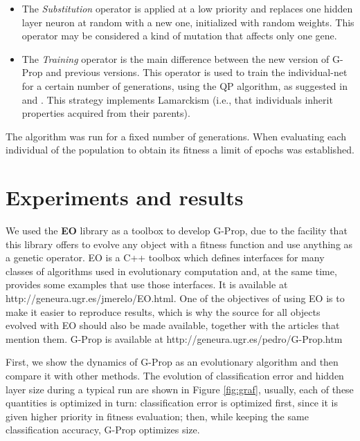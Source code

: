 \documentclass{llncs}
\begin{document}
\begin{itemize}
\item The \emph{Substitution} operator is applied at a low priority and replaces one hidden layer neuron at random with a new one, initialized with random weights. This operator may be considered a kind of mutation that affects only one gene.


\item The \emph{Training} operator is the main difference between the new version of G-Prop and previous versions. This operator is used to train the individual-net for a certain number of generations, using the QP algorithm, as suggested in \cite{Montana} and \cite{Yao98}. This strategy implements Lamarckism (i.e., that individuals inherit properties acquired from their parents).

\end{itemize}

The algorithm was run for a fixed number of generations.
When evaluating each individual of the population to obtain its fitness a limit of epochs was established. 
 

\section{Experiments and results}
\label{sec:expe}

We used the \textbf{EO} library as a toolbox to develop G-Prop, due to the facility that this library offers to evolve any object with a fitness function and use anything as a genetic operator. EO is a C++ toolbox which defines interfaces for many classes of algorithms used in evolutionary computation and, at the same time, provides some examples that use those interfaces. It is available at {\sf http://geneura.ugr.es/jmerelo/EO.html}. One of the objectives of using EO is to make it easier to reproduce results, which is why the source for all objects evolved with EO should also be made available, together with the articles that mention them. G-Prop is available at {\sf http://geneura.ugr.es/pedro/G-Prop.htm}

First, we show the dynamics of G-Prop as an evolutionary algorithm and then compare it with other methods.
The evolution of classification error and hidden layer size during a typical run are shown in Figure  \ref{fig:graf}, usually, each of these quantities is optimized in turn: classification error is optimized first, since it is given higher priority in fitness evaluation; then, while keeping the same classification accuracy, G-Prop optimizes size. 
\end{document}
